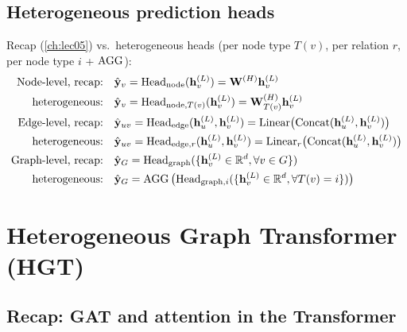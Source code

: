 \subsection{Heterogeneous prediction heads}\label{sec:lec09-heads}

Recap (\cref{ch:lec05}) vs.\ heterogeneous heads (per node type $T(v)$, per
relation $r$, per node type $i$ + $\operatorname{AGG}$):
\begin{align}
  \text{Node-level, recap:}\quad
    & \hat{\mathbf{y}}_v = \mathrm{Head}_{\mathrm{node}}(\mathbf{h}_v^{(L)}) = \mathbf{W}^{(H)}\mathbf{h}_v^{(L)}
    \notag\\
  \text{heterogeneous:}\quad
    & \hat{\mathbf{y}}_v = \mathrm{Head}_{\mathrm{node},T(v)}(\mathbf{h}_v^{(L)})
      = \mathbf{W}_{T(v)}^{(H)}\mathbf{h}_v^{(L)}
    \label{eq:lec09-head-node}\\
  \text{Edge-level, recap:}\quad
    & \hat{\mathbf{y}}_{uv} = \mathrm{Head}_{\mathrm{edge}}(\mathbf{h}_u^{(L)},\mathbf{h}_v^{(L)})
      = \mathrm{Linear}\big(\mathrm{Concat}(\mathbf{h}_u^{(L)},\mathbf{h}_v^{(L)})\big)
    \notag\\
  \text{heterogeneous:}\quad
    & \hat{\mathbf{y}}_{uv} = \mathrm{Head}_{\mathrm{edge},r}(\mathbf{h}_u^{(L)},\mathbf{h}_v^{(L)})
      = \mathrm{Linear}_r\big(\mathrm{Concat}(\mathbf{h}_u^{(L)},\mathbf{h}_v^{(L)})\big)
    \label{eq:lec09-head-edge}\\
  \text{Graph-level, recap:}\quad
    & \hat{\mathbf{y}}_G = \mathrm{Head}_{\mathrm{graph}}(\{\mathbf{h}_v^{(L)}\in\mathbb{R}^d, \forall v\in G\})
    \notag\\
  \text{heterogeneous:}\quad
    & \hat{\mathbf{y}}_G = \operatorname{AGG}\big(\mathrm{Head}_{\mathrm{graph},i}(\{\mathbf{h}_v^{(L)}\in\mathbb{R}^d,
      \forall T(v)=i\})\big)
    \label{eq:lec09-head-graph}
\end{align}

\section{Heterogeneous Graph Transformer (HGT)}\label{sec:lec09-hgt}

\subsection{Recap: GAT and attention in the Transformer}\label{sec:lec09-attn}

